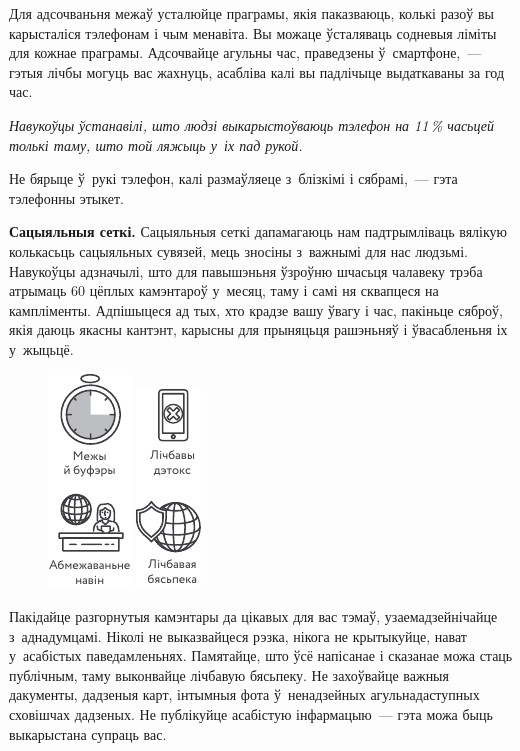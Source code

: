 Для адсочваньня межаў усталюйце праграмы, якія паказваюць, колькі разоў вы карысталіся тэлефонам і чым менавіта. Вы можаце ўсталяваць содневыя ліміты для кожнае праграмы. Адсочвайце агульны час, праведзены ў~смартфоне,~--- гэтыя лічбы могуць вас жахнуць, асабліва калі вы падлічыце выдаткаваны за год час.

\emph{Навукоўцы ўстанавілі, што людзі выкарыстоўваюць тэлефон на 11\,\% часьцей толькі таму, што той ляжыць у~іх пад рукой.}

Не бярыце ў~рукі тэлефон, калі размаўляеце з~блізкімі і сябрамі,~--- гэта тэлефонны этыкет.

\textbf{Сацыяльныя сеткі.} Сацыяльныя сеткі дапамагаюць нам падтрымліваць вялікую колькасьць сацыяльных сувязей, мець зносіны з~важнымі для нас людзьмі. Навукоўцы адзначылі, што для павышэньня ўзроўню шчасьця чалавеку трэба атрымаць 60 цёплых камэнтароў у~месяц, таму і самі ня сквапцеся на кампліменты. Адпішыцеся ад тых, хто крадзе вашу ўвагу і час, пакіньце сяброў, якія даюць якасны кантэнт, карысны для прыняцьця рашэньняў і ўвасабленьня іх у~жыцьцё.

\begin{figure}[htb!]
  \centering
  \includegraphics[scale=1.5]{willpower/ch13/8.pdf}\qquad
  \includegraphics[scale=1.5]{willpower/ch13/9.pdf}
\end{figure}

Пакідайце разгорнутыя камэнтары да цікавых для вас тэмаў, узаемадзейнічайце з~аднадумцамі. Ніколі не выказвайцеся рэзка, нікога не крытыкуйце, нават у~асабістых паведамленьнях. Памятайце, што ўсё напісанае і сказанае можа стаць публічным, таму выконвайце лічбавую бясьпеку. Не захоўвайце важныя дакументы, дадзеныя карт, інтымныя фота ў~ненадзейных агульнадаступных сховішчах дадзеных. Не публікуйце асабістую інфармацыю~--- гэта можа быць выкарыстана супраць вас.

